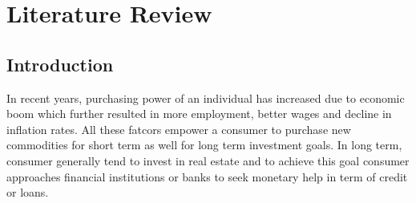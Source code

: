 %
%
%
%

\chapter{Literature Review}\label{C.LitReview}
\section{Introduction}\label{S.intro3}

In recent years, purchasing power of an individual has increased due to economic boom which further resulted in more employment, better wages and decline in inflation rates. All these fatcors empower a consumer to purchase new commodities for short term as well for long term investment goals. In long term, consumer generally tend to invest in real estate and to achieve this goal consumer approaches financial institutions or banks to seek monetary help in term of credit or loans.\\

